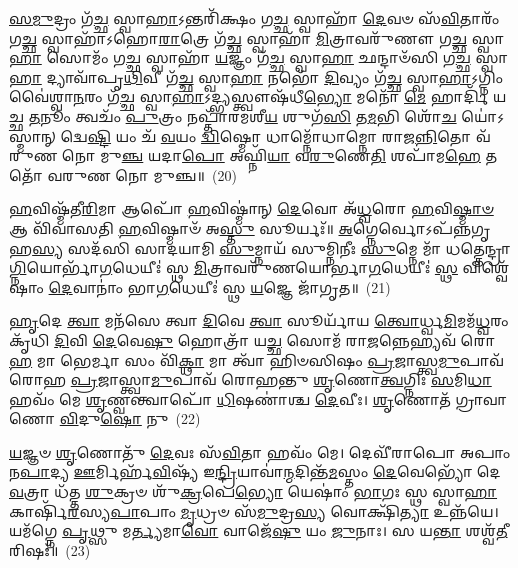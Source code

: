 {\anuvakamend[{𑌵𑌾𑌤᳴\-\ul{𑌸𑍍𑌯𑌾}\-𑌷𑍍𑌟𑌾𑌵𑌿𑍞᳴𑌶𑌤𑌿𑌶𑍍𑌚}]}%

\-\ul{𑌸}\-\-\ul{𑌮𑍁}\-𑌦𑍍𑌰𑌂 𑌗᳴\-\ul{𑌚𑍍𑌛} 𑌸𑍍𑌵𑌾\-\ul{𑌹𑌾}\-\-𑌽𑌨𑍍𑌤𑌰𑌿᳴𑌕𑍍𑌷𑌂 𑌗\-\ul{𑌚𑍍𑌛} 𑌸𑍍𑌵𑌾𑌹𑌾᳴ \ul{𑌦𑍇}\-𑌵𑍞 𑌸᳴\-\ul{𑌵𑌿}\-𑌤𑌾𑌰𑌂᳴ 𑌗\-\ul{𑌚𑍍𑌛} 𑌸𑍍𑌵𑌾𑌹𑌾᳴\-𑌽𑌹𑍋\-\ul{𑌰𑌾}\-𑌤𑍍𑌰𑍇 𑌗᳴\-\ul{𑌚𑍍𑌛} 𑌸𑍍𑌵𑌾𑌹𑌾᳴ \ul{𑌮𑌿}\-𑌤𑍍𑌰𑌾𑌵𑌰𑍁᳴𑌣𑍗 𑌗\-\ul{𑌚𑍍𑌛} 𑌸𑍍𑌵𑌾\-\ul{𑌹𑌾} 𑌸𑍋𑌮𑌂᳴ 𑌗\-\ul{𑌚𑍍𑌛} 𑌸𑍍𑌵𑌾𑌹𑌾᳴ \ul{𑌯}\-𑌜𑍍𑌞𑌂 𑌗᳴\-\ul{𑌚𑍍𑌛} 𑌸𑍍𑌵𑌾\-\ul{𑌹𑌾} 𑌛𑌨𑍍𑌦𑌾𑍞᳴𑌸𑌿 𑌗\-\ul{𑌚𑍍𑌛} 𑌸𑍍𑌵𑌾\-\ul{𑌹𑌾} 𑌦𑍍𑌯𑌾𑌵𑌾᳴𑌪𑍃\-\ul{𑌥𑌿}\-𑌵𑍀 𑌗᳴\-\ul{𑌚𑍍𑌛} 𑌸𑍍𑌵𑌾\-\ul{𑌹𑌾} 𑌨𑌭𑍋᳴ \ul{𑌦𑌿}\-𑌵𑍍𑌯𑌂 𑌗᳴\-\ul{𑌚𑍍𑌛} 𑌸𑍍𑌵𑌾\-\ul{𑌹𑌾}\-\-𑌽𑌗𑍍𑌨𑌿𑌂 𑌵𑍈॑𑌶𑍍𑌵𑌾\-\ul{𑌨}\-𑌰𑌂 𑌗᳴\-\ul{𑌚𑍍𑌛} 𑌸𑍍𑌵𑌾\-\ul{𑌹𑌾}\-\-𑌽𑌦𑍍𑌭𑍍𑌯𑌸𑍍𑌤𑍍𑌵𑍗𑌷᳴𑌧𑍀\-\ul{𑌭𑍍𑌯𑍋} 𑌮𑌨𑍋᳴ \ul{𑌮𑍇} 𑌹𑌾𑌰𑍍𑌦𑌿᳴ 𑌯𑌚𑍍𑌛 \ul{𑌤}\-𑌨𑍂𑌂 𑌤𑍍𑌵𑌚𑌂᳴ \ul{𑌪𑍁}\-𑌤𑍍𑌰𑌂 𑌨𑌪𑍍𑌤𑌾᳴𑌰𑌮𑌶𑍀\-\ul{𑌯} 𑌶𑍁𑌗᳴\-\ul{𑌸𑌿} 𑌤\-\ul{𑌮}\-𑌭𑌿 𑌶𑍋᳴\-\ul{𑌚} 𑌯𑍋॑\-𑌽𑌸𑍍𑌮𑌾𑌨𑍍 𑌦𑍍𑌵𑍇\-\ul{𑌷𑍍𑌟𑌿} 𑌯𑌂 𑌚᳴ \ul{𑌵}\-𑌯𑌂 \ul{𑌦𑍍𑌵𑌿}\-𑌷𑍍𑌮𑍋 𑌧𑌾𑌮𑍍𑌨𑍋᳴𑌧𑌾𑌮𑍍𑌨𑍋 𑌰𑌾𑌜\-\ul{𑌨𑍍𑌨𑌿}\-𑌤𑍋 𑌵᳴𑌰𑍁𑌣 𑌨𑍋 𑌮𑍁\-\ul{𑌞𑍍𑌚} 𑌯𑌦𑌾\-\ul{𑌪𑍋} 𑌅𑌘𑍍𑌨𑌿᳴\-\ul{𑌯𑌾} 𑌵\-\ul{𑌰𑍁}\-𑌣𑍇\-\ul{𑌤𑌿} 𑌶𑌪𑌾᳴𑌮\-\ul{𑌹𑍇} 𑌤𑌤𑍋᳴ 𑌵𑌰𑍁𑌣 𑌨𑍋 𑌮𑍁𑌞𑍍𑌚॥~(20)

{\anuvakamend[{\-\ul{𑌅}\-\-\ul{𑌸𑌿} 𑌷𑌡𑍍𑌵𑌿𑍞᳴𑌶𑌤𑌿𑌶𑍍𑌚}]}%

\-\ul{𑌹}\-𑌵𑌿𑌷𑍍𑌮᳴𑌤𑍀\-\ul{𑌰𑌿}\-𑌮𑌾 𑌆𑌪𑍋᳴ \ul{𑌹}\-𑌵𑌿𑌷𑍍𑌮𑌾॑𑌨𑍍 \ul{𑌦𑍇}\-𑌵𑍋 𑌅᳴\-\ul{𑌧𑍍𑌵}\-𑌰𑍋 \ul{𑌹}\-𑌵𑌿\-\ul{𑌷𑍍𑌮𑌾}\-\-\ul{𑍞} 𑌆 𑌵𑌿᳴𑌵𑌾𑌸𑌤𑌿 \ul{𑌹}\-𑌵𑌿𑌷𑍍𑌮𑌾𑍞᳴ 𑌅\-\ul{𑌸𑍍𑌤𑍁} 𑌸𑍂𑌰𑍍𑌯𑌃᳴॥ \ul{𑌅}\-𑌗𑍍𑌨𑍇𑌰𑍍𑌵𑍋\-𑌽𑌪᳴𑌨𑍍𑌨𑌗𑍃𑌹\-\ul{𑌸𑍍𑌯} 𑌸𑌦᳴𑌸𑌿 𑌸𑌾𑌦𑌯𑌾𑌮𑌿 \ul{𑌸𑍁}\-𑌮𑍍𑌨𑌾𑌯᳴ 𑌸𑍁𑌮𑍍𑌨𑌿𑌨𑍀𑌃 \ul{𑌸𑍁}\-𑌮𑍍𑌨𑍇 𑌮𑌾᳴ 𑌧𑌤𑍍𑌤𑍇𑌨𑍍𑌦𑍍𑌰𑌾\-\ul{𑌗𑍍𑌨𑌿}\-𑌯𑍋𑌰𑍍𑌭𑌾᳴\-\ul{𑌗}\-𑌧𑍇𑌯𑍀𑌃॑ 𑌸𑍍𑌥 \ul{𑌮𑌿}\-𑌤𑍍𑌰𑌾𑌵𑌰𑍁᳴𑌣𑌯𑍋𑌰𑍍𑌭𑌾\-\ul{𑌗}\-𑌧𑍇𑌯𑍀𑌃॑ \ul{𑌸𑍍𑌥} 𑌵𑌿𑌶𑍍𑌵𑍇᳴𑌷𑌾𑌂 \ul{𑌦𑍇}\-𑌵𑌾𑌨𑌾𑌂॑ 𑌭𑌾\-\ul{𑌗}\-𑌧𑍇𑌯𑍀𑌃॑ 𑌸𑍍𑌥 \ul{𑌯}\-𑌜𑍍𑌞𑍇 𑌜𑌾᳴𑌗𑍃𑌤॥~(21)

{\anuvakamend[{\-\ul{𑌹}\-𑌵𑌿𑌷𑍍𑌮᳴\-\ul{𑌤𑍀}\-𑌶𑍍𑌚𑌤𑍁᳴𑌸𑍍𑌰𑌿𑍞𑌶𑌤𑍍}]}%

\-\ul{𑌹𑍃}\-𑌦𑍇 \ul{𑌤𑍍𑌵𑌾} 𑌮𑌨᳴𑌸𑍇 𑌤𑍍𑌵𑌾 \ul{𑌦𑌿}\-𑌵𑍇 \ul{𑌤𑍍𑌵𑌾} 𑌸𑍂𑌰𑍍𑌯𑌾᳴𑌯 \ul{𑌤𑍍𑌵𑍋}\-𑌰𑍍𑌧𑍍𑌵\-\ul{𑌮𑌿}\-𑌮𑌮᳴\-\ul{𑌧𑍍𑌵}\-𑌰𑌂 𑌕𑍃᳴𑌧𑌿 \ul{𑌦𑌿}\-𑌵𑌿 \ul{𑌦𑍇}\-𑌵𑍇\-\ul{𑌷𑍁} 𑌹𑍋𑌤𑍍𑌰𑌾᳴ 𑌯\-\ul{𑌚𑍍𑌛} 𑌸𑍋𑌮᳴ 𑌰𑌾\-\ul{𑌜}\-𑌨𑍍𑌨𑍇𑌹𑍍𑌯𑌵᳴ 𑌰𑍋\-\ul{𑌹} 𑌮𑌾 𑌭𑍇𑌰𑍍𑌮𑌾 𑌸𑌂 𑌵𑌿᳴\-\ul{𑌕𑍍𑌥𑌾} 𑌮𑌾 𑌤𑍍𑌵𑌾᳴ 𑌹𑌿𑍞𑌸𑌿𑌷𑌂 \ul{𑌪𑍍𑌰}\-𑌜𑌾𑌸𑍍𑌤𑍍𑌵\-\ul{𑌮𑍁}\-𑌪𑌾𑌵᳴𑌰𑍋𑌹 \ul{𑌪𑍍𑌰}\-𑌜𑌾𑌸𑍍𑌤𑍍𑌵𑌾\-\ul{𑌮𑍁}\-𑌪𑌾𑌵᳴ 𑌰𑍋𑌹𑌨𑍍𑌤𑍁 \ul{𑌶𑍃}\-𑌣𑍋\-\ul{𑌤𑍍𑌵}\-𑌗𑍍𑌨𑌿𑌃 \ul{𑌸}\-𑌮𑌿\-\ul{𑌧𑌾} 𑌹𑌵𑌂᳴ 𑌮𑍇 \ul{𑌶𑍃}\-𑌣𑍍𑌵𑌨𑍍𑌤𑍍𑌵𑌾𑌪𑍋᳴ \ul{𑌧𑌿}\-𑌷𑌣𑌾॑𑌶𑍍𑌚 \ul{𑌦𑍇}\-𑌵𑍀𑌃। \ul{𑌶𑍃}\-𑌣𑍋𑌤᳴ 𑌗𑍍𑌰𑌾𑌵𑌾𑌣𑍋 \ul{𑌵𑌿}\-𑌦𑍁\-\ul{𑌷𑍋} 𑌨𑍁~(22)

\-\ul{𑌯}\-𑌜𑍍𑌞𑍞 \ul{𑌶𑍃}\-𑌣𑍋𑌤𑍁᳴ \ul{𑌦𑍇}\-𑌵𑌃 𑌸᳴\-\ul{𑌵𑌿}\-𑌤𑌾 𑌹𑌵𑌂᳴ 𑌮𑍇। 𑌦𑍇𑌵𑍀᳴𑌰𑌾𑌪𑍋 𑌅𑌪𑌾𑌂 𑌨\-\ul{𑌪𑌾}\-𑌦𑍍𑌯 \ul{𑌊}\-𑌰𑍍𑌮𑌿𑌰𑍍\mbox{}𑌹᳴\-\ul{𑌵𑌿}\-𑌷𑍍𑌯᳴ 𑌇\-\ul{𑌨𑍍𑌦𑍍𑌰𑌿}\-𑌯𑌾𑌵𑌾॑\-\ul{𑌨𑍍𑌮}\-𑌦𑌿𑌨𑍍𑌤᳴\-\ul{𑌮}\-𑌸𑍍𑌤𑌂 \ul{𑌦𑍇}\-𑌵𑍇𑌭𑍍𑌯𑍋᳴ 𑌦𑍇\-\ul{𑌵}\-𑌤𑍍𑌰𑌾 𑌧᳴𑌤𑍍𑌤 \ul{𑌶𑍁}\-𑌕𑍍𑌰𑍞 𑌶𑍁᳴\-\ul{𑌕𑍍𑌰}\-𑌪𑍇\-\ul{𑌭𑍍𑌯𑍋} 𑌯𑍇𑌷𑌾𑌂॑ \ul{𑌭𑌾}\-𑌗𑌃 𑌸𑍍𑌥 𑌸𑍍𑌵𑌾\-\ul{𑌹𑌾} 𑌕𑌾𑌰𑍍\mbox{}𑌷𑌿᳴\-\ul{𑌰}\-𑌸𑍍𑌯\-\ul{𑌪𑌾}\-𑌪𑌾𑌂 \ul{𑌮𑍃}\-𑌧𑍍𑌰𑍞 𑌸᳴\-\ul{𑌮𑍁}\-𑌦𑍍𑌰\-\ul{𑌸𑍍𑌯} 𑌵𑍋𑌕𑍍𑌷𑌿᳴\-\ul{𑌤𑍍𑌯𑌾} 𑌉𑌨𑍍𑌨᳴𑌯𑍇। 𑌯𑌮᳴𑌗𑍍𑌨𑍇 \ul{𑌪𑍃}\-𑌥𑍍𑌸𑍁 𑌮\-\ul{𑌰𑍍𑌤𑍍𑌯}\-𑌮𑌾\-\ul{𑌵𑍋} 𑌵𑌾𑌜𑍇᳴\-\ul{𑌷𑍁} 𑌯𑌂 \ul{𑌜𑍁}\-𑌨𑌾𑌃। 𑌸 𑌯\-\ul{𑌨𑍍𑌤𑌾} 𑌶𑌶𑍍𑌵᳴\-\ul{𑌤𑍀}\-𑌰𑌿𑌷𑌃᳴॥~(23)

